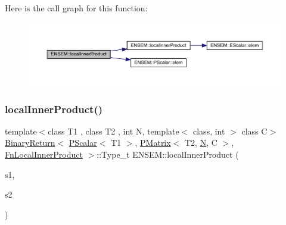 Here is the call graph for this function\+:\nopagebreak
\begin{figure}[H]
\begin{center}
\leavevmode
\includegraphics[width=350pt]{df/d0a/group__primmatrix_gafc7ce30ddacb0b13e2db237cfa268161_cgraph}
\end{center}
\end{figure}
\mbox{\label{group__primmatrix_gaaa8729c59af4a03489be7e620e3dd187}} 
\subsubsection{\texorpdfstring{localInnerProduct()}{localInnerProduct()}\hspace{0.1cm}{\footnotesize\ttfamily [3/3]}}
{\footnotesize\ttfamily template$<$class T1 , class T2 , int N, template$<$ class, int $>$ class C$>$ \\
\mbox{\hyperlink{structENSEM_1_1BinaryReturn}{Binary\+Return}}$<$ \mbox{\hyperlink{classENSEM_1_1PScalar}{P\+Scalar}}$<$ T1 $>$, \mbox{\hyperlink{classENSEM_1_1PMatrix}{P\+Matrix}}$<$ T2, \mbox{\hyperlink{operator__name__util_8cc_a7722c8ecbb62d99aee7ce68b1752f337}{N}}, C $>$, \mbox{\hyperlink{structENSEM_1_1FnLocalInnerProduct}{Fn\+Local\+Inner\+Product}} $>$\+::Type\+\_\+t E\+N\+S\+E\+M\+::local\+Inner\+Product (\begin{DoxyParamCaption}\item[{const \mbox{\hyperlink{classENSEM_1_1PScalar}{P\+Scalar}}$<$ T1 $>$ \&}]{s1,  }\item[{const \mbox{\hyperlink{classENSEM_1_1PMatrix}{P\+Matrix}}$<$ T2, \mbox{\hyperlink{operator__name__util_8cc_a7722c8ecbb62d99aee7ce68b1752f337}{N}}, C $>$ \&}]{s2 }\end{DoxyParamCaption})\hspace{0.3cm}{\ttfamily [inline]}}

